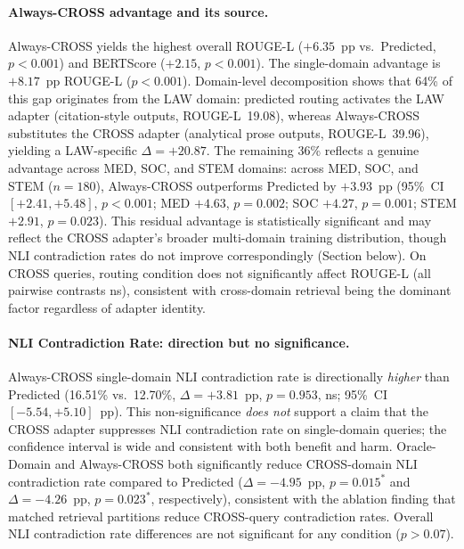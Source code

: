 \documentclass[a4paper,fleql,doubleblind]{cas-sc}
\begin{document}
\paragraph{Always-CROSS advantage and its source.}
Always-CROSS yields the highest overall ROUGE-L ($+6.35$~pp vs.\ Predicted,
$p{<}0.001$) and BERTScore ($+2.15$, $p{<}0.001$).
The single-domain advantage is $+8.17$~pp ROUGE-L ($p{<}0.001$).
Domain-level decomposition shows that 64\% of this gap originates from the LAW domain:
predicted routing activates the LAW adapter (citation-style outputs, ROUGE-L~19.08),
whereas Always-CROSS substitutes the CROSS adapter (analytical prose outputs, ROUGE-L~39.96),
yielding a LAW-specific $\Delta{=}{+}20.87$.
The remaining 36\% reflects a genuine advantage across MED, SOC, and STEM domains:
across MED, SOC, and STEM ($n{=}180$), Always-CROSS outperforms Predicted by
$+3.93$~pp (95\%~CI $[{+}2.41,{+}5.48]$, $p{<}0.001$; MED $+4.63$, $p{=}0.002$;
SOC $+4.27$, $p{=}0.001$; STEM $+2.91$, $p{=}0.023$).
This residual advantage is statistically significant and may reflect the CROSS
adapter's broader multi-domain training distribution, though NLI contradiction rates
do not improve correspondingly (Section below).
On CROSS queries, routing condition does not significantly affect ROUGE-L
(all pairwise contrasts \textsf{ns}), consistent with cross-domain retrieval
being the dominant factor regardless of adapter identity.

\paragraph{NLI Contradiction Rate: direction but no significance.}
Always-CROSS single-domain NLI contradiction rate is directionally \emph{higher}
than Predicted (16.51\% vs.\ 12.70\%, $\Delta{=}{+}3.81$~pp,
$p{=}0.953$, \textsf{ns}; 95\%~CI $[-5.54,{+}5.10]$~pp).
This non-significance \emph{does not} support a claim that the CROSS adapter
suppresses NLI contradiction rate on single-domain queries; the confidence interval
is wide and consistent with both benefit and harm.
Oracle-Domain and Always-CROSS both significantly reduce CROSS-domain
NLI contradiction rate compared to Predicted ($\Delta{=}{-}4.95$~pp, $p{=}0.015^{*}$
and $\Delta{=}{-}4.26$~pp, $p{=}0.023^{*}$, respectively),
consistent with the ablation finding that matched retrieval partitions
reduce CROSS-query contradiction rates.
Overall NLI contradiction rate differences are not significant for any condition
($p{>}0.07$).
\end{document}

